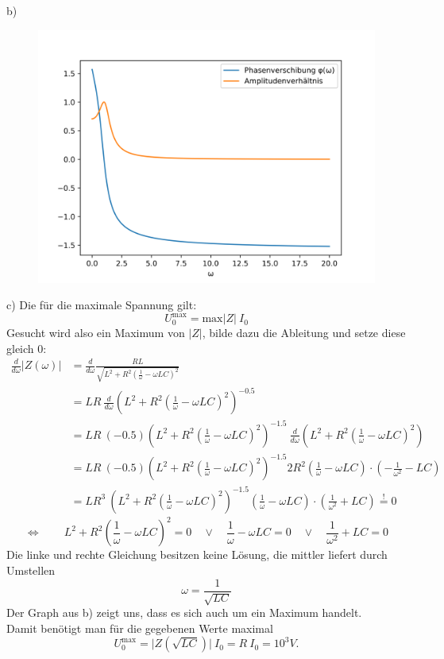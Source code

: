 \documentclass[11pt a4paper]{article}
\begin{document}
\newpage
b)
\begin{figure}[H]
	\centering
	\includegraphics[width=12cm]{aufgabe3.png}
\end{figure}

c) Die für die maximale Spannung gilt:
\[ U_0^\text{max} = \text{max}\vert Z \vert \ I_0 \]
Gesucht wird also ein Maximum von $\vert Z \vert$, bilde dazu die Ableitung und setze diese gleich 0:
\begin{align*}
	\frac{d}{d\omega} \vert Z(\omega) \vert 
	&= \frac{d}{d\omega} \frac{RL}{\sqrt{L^2 + R^2  \left(\frac1\omega - \omega LC \right)^2}} \\
	&= LR \ \frac{d}{d\omega} \left(L^2 + R^2  \left(\frac1\omega - \omega LC \right)^2 \right)^{-0.5} \\
	&= LR \ (-0.5) \left(L^2 + R^2  \left(\frac1\omega - \omega LC \right)^2 \right)^{-1.5}
		\ \frac{d}{d\omega} \left(L^2 + R^2  \left(\frac1\omega - \omega LC \right)^2 \right) \\
	&= LR \ (-0.5) \left(L^2 + R^2  \left(\frac1\omega - \omega LC \right)^2 \right)^{-1.5}
		2R^2  \left(\frac1\omega - \omega LC \right) \cdot \left(-\frac{1}{\omega^2} - LC \right) \\
	&= LR^3 \ \left(L^2 + R^2  \left(\frac1\omega - \omega LC \right)^2 \right)^{-1.5}
		\left(\frac1\omega - \omega LC \right) \cdot \left(\frac{1}{\omega^2} + LC \right) 
	\overset != 0
\end{align*}
\[
\Leftrightarrow \qquad
	L^2 + R^2  \left(\frac1\omega - \omega LC \right)^2 = 0 \quad \lor \quad
	\frac1\omega - \omega LC = 0 \quad \lor \quad
	\frac{1}{\omega^2} + LC = 0
\]
Die linke und rechte Gleichung besitzen keine Lösung, die mittler liefert durch Umstellen
\[ \omega = \frac 1 {\sqrt{LC}} \]
Der Graph aus b) zeigt uns, dass es sich auch um ein Maximum handelt. \\
Damit benötigt man für die gegebenen Werte maximal
\[ U_0^\text{max} =  \vert Z\left(\sqrt{LC}\right) \vert \ I_0 = R \ I_0 = 10^3 V. \]
\end{document}
